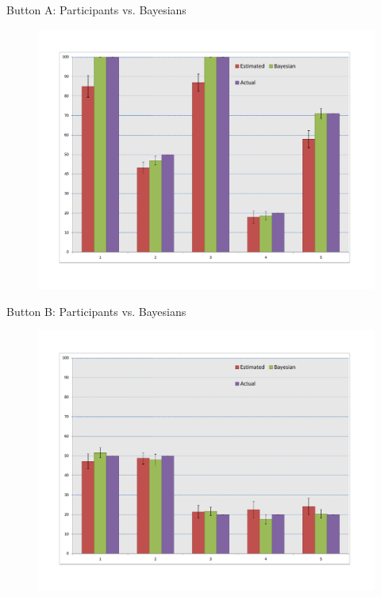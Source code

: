 \documentclass{beamer}
\begin{document}
\begin{frame}{Button A: Participants vs. Bayesians}
	\begin{figure}
	\begin{center}
		\includegraphics[width=\linewidth]{bayesian_bar_button_A}
	\end{center}
	\end{figure}
\end{frame}

\begin{frame}{Button B: Participants vs. Bayesians}
	\begin{figure}
	\begin{center}
		\includegraphics[width=\linewidth]{bayesian_bar_button_B}
	\end{center}
	\end{figure}
\end{frame}
\end{document}
